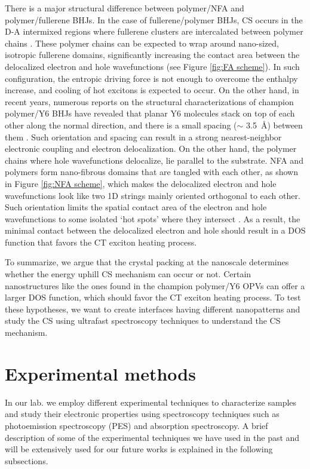 \documentclass[12pt]{article}
\begin{document}
There is a major structural difference between polymer/NFA and polymer/fullerene BHJs. In the case of fullerene/polymer BHJs, CS occurs in the D-A intermixed regions where fullerene clusters are intercalated between polymer chains \cite{causa2016fate}. These polymer chains can be expected to wrap around nano-sized, isotropic fullerene domains, significantly increasing the contact area between the delocalized electron and hole wavefunctions (see Figure \ref{fig:FA scheme}). In such configuration, the entropic driving force is not enough to overcome the enthalpy increase, and cooling of hot excitons is expected to occur. On the other hand, in recent years, numerous reports on the structural characterizations of champion polymer/Y6 BHJs have revealed that planar Y6 molecules stack on top of each other along the normal direction, and there is a small spacing ($\sim$ \SI{3.5}{\angstrom}) between them \cite{liu202018,zhang2020delocalization,zhu2020crystallography}. Such orientation and spacing can result in a strong nearest-neighbor electronic coupling and electron delocalization. On the other hand, the polymer chains where hole wavefunctions delocalize, lie parallel to the substrate. NFA and polymers form nano-fibrous domains that are tangled with each other, as shown in Figure \ref{fig:NFA scheme}, which makes the delocalized electron and hole wavefunctions look like two 1D strings mainly oriented orthogonal to each other. Such orientation limits the spatial contact area of the electron and hole wavefunctions to some isolated \lq{hot spots}' where they intersect \cite{zhang2020delocalization}. As a result, the minimal contact between the delocalized electron and hole should result in a DOS function that favors the CT exciton heating process.
\vspace{7pt}

To summarize, we argue that the crystal packing at the nanoscale determines whether the energy uphill CS mechanism can occur or not. Certain nanostructures like the ones found in the champion polymer/Y6 OPVs can offer a larger DOS function, which should favor the CT exciton heating process. To test these hypotheses, we want to create interfaces having different nanopatterns and study the CS using ultrafast spectroscopy techniques to understand the CS mechanism.

\section{Experimental methods}
In our lab. we employ different experimental techniques to characterize samples and study their electronic properties using spectroscopy techniques such as photoemission spectroscopy (PES) and absorption spectroscopy. A brief description of some of the experimental techniques we have used in the past and will be extensively used for our future works is explained in the following subsections. 
\end{document}
